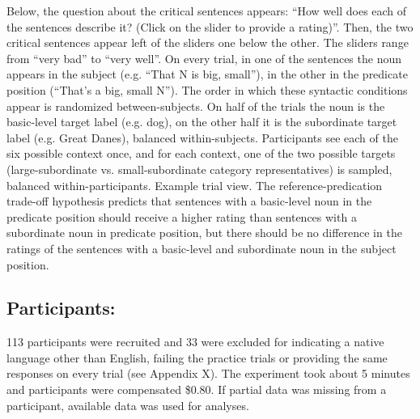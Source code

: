 Below, the question about the critical sentences appears: “How well does each of the sentences describe it? (Click on the slider to provide a rating)”. Then, the two critical sentences appear left of the sliders one below the other. The sliders range from “very bad” to “very well”. On every trial, in one of the sentences the noun appears in the subject (e.g. “That N is {big, small}”), in the other in the predicate position (“That’s a {big, small} N”). The order in which these syntactic conditions appear is randomized between-subjects. 
On half of the trials the noun is the basic-level target label (e.g. dog), on the other half it is the subordinate target label (e.g. Great Danes), balanced within-subjects. 
Participants see each of the six possible context once, and for each context, one of the two possible targets (large-subordinate vs. small-subordinate category representatives) is sampled, balanced within-participants. 
Example trial view.
The reference-predication trade-off hypothesis predicts that sentences with a basic-level noun in the predicate position should receive a higher rating than sentences with a subordinate noun in predicate position, but there should be no difference in the ratings of the sentences with a basic-level and  subordinate noun in the subject position.  

\subsection{Participants:}
113 participants were recruited and 33 were excluded for indicating a native language other than English, failing the practice trials or providing the same responses on every trial (see Appendix X). The experiment took about 5 minutes and participants were compensated \$0.80. If partial data was missing from a participant, available data was used for analyses. 
